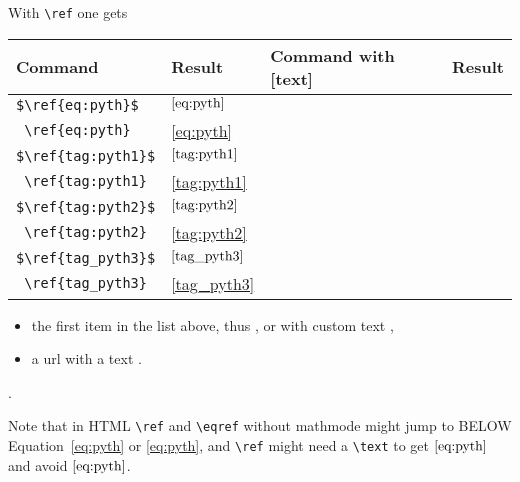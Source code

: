 \documentclass[landscape]{ximera}
\begin{document}
With \verb|\ref| one gets 

\begin{center}
\begin{tabular}{|l|l|l|l|}
\hline
Command & Result & Command with [text] & Result \\
\hline
\verb|$\ref{eq:pyth}$|             &$\ref{eq:pyth}$     \\
\verb| \ref{eq:pyth} |             & \ref{eq:pyth}      \\
\hline
\verb|$\ref{tag:pyth1}$|           &$\ref{tag:pyth1}$     \\
\verb| \ref{tag:pyth1} |           & \ref{tag:pyth1}      \\
\hline
\verb|$\ref{tag:pyth2}$|           &$\ref{tag:pyth2}$     \\
\verb| \ref{tag:pyth2} |           & \ref{tag:pyth2}      \\
\hline
\verb|$\ref{tag_pyth3}$|           &$\ref{tag_pyth3}$     \\
\verb| \ref{tag_pyth3} |           & \ref{tag_pyth3}      \\
\hline
\end{tabular}
\end{center}

\begin{itemize}
  \item the first item in the list above, thus , 
        or with custom text ,
  \item a url with a text .
\end{itemize}.


Note that in HTML \verb|\ref| and \verb|\eqref| without mathmode might jump to BELOW Equation~\ref{eq:pyth} or \eqref{eq:pyth}, and
\verb|\ref| might need a \verb|\text| to get $\text{\ref{eq:pyth}}$ and avoid $\ref{eq:pyth}$.
\end{document}
